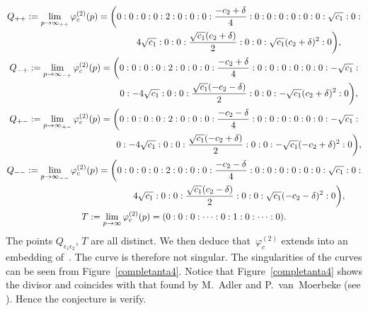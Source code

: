 \documentclass[10pt,a4paper]{amsart}
\numberwithin{equation}{section}
\begin{document}
\begin{gather*}
 Q_{++} :=\lim \limits_{p\rightarrow
 \infty_{++}}\varphi_c^{(2)}(p)
 = \biggl(0:0:0:0:2:0:0:0:\frac{-c_2+\delta}{4}:0:0:0:0:0:0: \sqrt{c_1}:0:\\ \hphantom{ Q_{++} :=\lim \limits_{p\rightarrow\infty_{++}}\varphi_c^{(2)}(p) =\biggl(}{}
 4\sqrt{c_1}:0:0:\frac{\sqrt{c_1}(c_2+\delta)}{2}:0:0:\sqrt{c_1}(c_2+\delta)^2:0\biggr),\\
 Q_{-+} :=\lim \limits_{p\rightarrow
 \infty_{-+}}\varphi_c^{(2)}(p)
 = \biggl(0:0:0:0:2:0:0:0:\frac{-c_2+\delta}{4}:0:0:0:0:0:0: -\sqrt{c_1}:\\ \hphantom{Q_{-+} :=\lim \limits_{p\rightarrow\infty_{-+}}\varphi_c^{(2)}(p) =\biggl(}{}
 0:-4\sqrt{c_1}:0:0:\frac{\sqrt{c_1}(-c_2-\delta)}{2}:0:0:-\sqrt{c_1}(c_2+\delta)^2:0\biggr),\\
 Q_{+-} :=\lim \limits_{p\rightarrow
 \infty_{+-}}\varphi_c^{(2)}(p)
 = \biggl(0:0:0:0:2:0:0:0:\frac{-c_2-\delta}{4}:0:0:0:0:0:0: -\sqrt{c_1}:\\ \hphantom{Q_{+-} :=\lim \limits_{p\rightarrow\infty_{+-}}\varphi_c^{(2)}(p)=\biggl(}{}
 0:-4\sqrt{c_1}:0:0:\frac{\sqrt{c_1}(-c_2+\delta)}{2}:0:0:-\sqrt{c_1}(-c_2+\delta)^2:0\biggr),\\
 Q_{--} :=\lim \limits_{p\rightarrow
 \infty_{--}}\varphi_c^{(2)}(p)
 = \biggl(0:0:0:0:2:0:0:0:\frac{-c_2-\delta}{4}:0:0:0:0:0:0: \sqrt{c_1}:0:\\ \hphantom{Q_{--} :=\lim \limits_{p\rightarrow\infty_{--}}\varphi_c^{(2)}(p)=\biggl(}{}
 4\sqrt{c_1}:0:0:\frac{\sqrt{c_1}(c_2-\delta)}{2}:0:0:\sqrt{c_1}(-c_2-\delta)^2:0\biggr),\\
 T :=\lim \limits_{p\rightarrow \infty}\varphi_c^{(2)}(p)=(0:0:0:\dots:0:1:0:\dots:0).
\end{gather*}
The points $Q_{\epsilon_1\epsilon_2}$, $T$ are all distinct. We
then deduce that~$\varphi_c^{(2)}$ extends into an
embedding of~. The curve
 is therefore not singular. The
singularities of the curves can be seen from Figure~\ref{completanta4}.
Notice that Figure~\ref{completanta4} shows the divisor and coincides with that
found by M.~Adler and P.~van~Moerbeke (see \cite[Table~2]{al_Moer4}). Hence the conjecture is verify.
\end{document}
